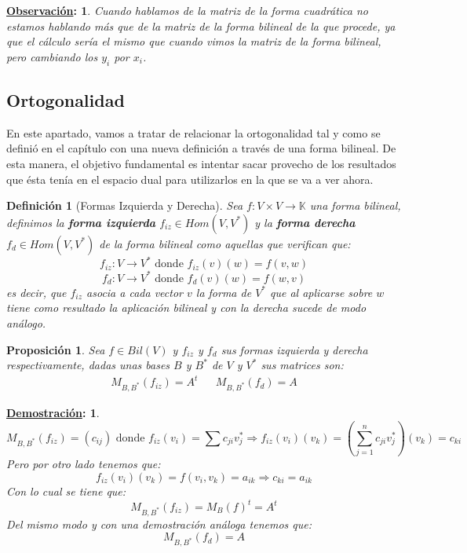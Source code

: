 \documentclass[10pt,a4paper,openright]{book}
\theoremstyle{break}
\newtheorem*{defi}{Definición}
\newtheorem*{prop}{Proposición}
\newtheorem*{demo}{\underline{Demostración}:}
\newtheorem*{obs}{\underline{Observación}:}
\begin{document}
\begin{obs}
Cuando hablamos de la matriz de la forma cuadrática no estamos hablando más que de la matriz de la forma bilineal de la que procede, ya que el cálculo sería el mismo que cuando vimos la matriz de la forma bilineal, pero cambiando los $y_i$ por $x_i$.
\end{obs}

\subsection{Ortogonalidad}
En este apartado, vamos a tratar de relacionar la ortogonalidad tal y como se definió en el capítulo  con una nueva definición a través de una forma bilineal. De esta manera, el objetivo fundamental es intentar sacar provecho de los resultados que ésta tenía en el espacio dual para utilizarlos en la que se va a ver ahora.

\begin{defi}[Formas Izquierda y Derecha]
Sea $f:V\times V \rightarrow \mathbb K$ una forma bilineal, definimos la \textbf{forma izquierda} $f_{iz} \in Hom(V,V^*)$ y la \textbf{forma derecha} $f_{d}\in Hom(V,V^*)$ de la forma bilineal como aquellas que verifican que:
$$f_{iz}: V\rightarrow V^*\mbox{ donde } f_{iz}(v)(w) = f(v,w)$$
$$f_{d}: V\rightarrow V^*\mbox{ donde } f_{d}(v)(w) = f(w,v)$$
es decir, que $f_{iz}$ asocia a cada vector $v$ la forma de $V^*$ que al aplicarse sobre $w$ tiene como resultado la aplicación bilineal y con la derecha sucede de modo análogo.
\end{defi}

\begin{prop}
Sea $f\in Bil(V)$ y $f_{iz}$ y $f_d$ sus formas izquierda y derecha respectivamente, dadas unas bases $B$ y $B^*$ de $V$ y $V^*$ sus matrices son:
\begin{align*}
M_{B,B^*}(f_{iz}) = A^t & & M_{B,B^*}(f_{d}) = A
\end{align*}
\end{prop}
\begin{demo}
$$M_{B,B^*}(f_{iz})= (c_{ij}) \mbox{ donde } f_{iz}(v_i)=\sum c_{ji}v_j^* \Rightarrow f_{iz}(v_i)(v_k)= \left(\sum_{j=1}^{n} c_{ji}v_j^*\right)(v_k) = c_{ki}$$
Pero por otro lado tenemos que:
$$f_{iz}(v_i)(v_k)=f(v_i,v_k) = a_{ik}\Rightarrow c_{ki} = a_{ik}$$
Con lo cual se tiene que:
$$M_{B,B^*}(f_{iz}) = M_B(f)^t = A^t$$
Del mismo modo y con una demostración análoga tenemos que:
$$M_{B,B^*}(f_d) = A$$
\end{demo}
\end{document}
